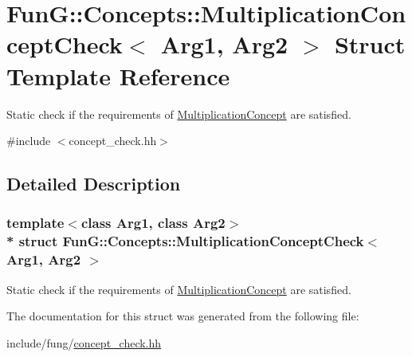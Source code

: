 \hypertarget{structFunG_1_1Concepts_1_1MultiplicationConceptCheck}{}\section{FunG\+:\+:Concepts\+:\+:Multiplication\+Concept\+Check$<$ Arg1, Arg2 $>$ Struct Template Reference}
\label{structFunG_1_1Concepts_1_1MultiplicationConceptCheck}


Static check if the requirements of \hyperlink{structFunG_1_1Concepts_1_1MultiplicationConcept}{Multiplication\+Concept} are satisfied.  




{\ttfamily \#include $<$concept\+\_\+check.\+hh$>$}



\subsection{Detailed Description}
\subsubsection*{template$<$class Arg1, class Arg2$>$\\*
struct Fun\+G\+::\+Concepts\+::\+Multiplication\+Concept\+Check$<$ Arg1, Arg2 $>$}

Static check if the requirements of \hyperlink{structFunG_1_1Concepts_1_1MultiplicationConcept}{Multiplication\+Concept} are satisfied. 

The documentation for this struct was generated from the following file\+:\begin{DoxyCompactItemize}
\item 
include/fung/\hyperlink{concept__check_8hh}{concept\+\_\+check.\+hh}\end{DoxyCompactItemize}
